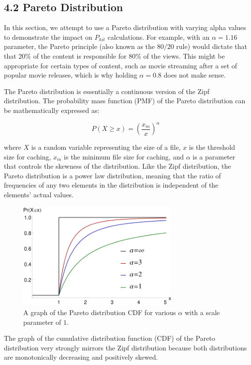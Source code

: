 \documentclass[
	a4paper, %
	10pt, %
	unnumberedsections, %
	twoside, %
]{LTJournalArticle}
\begin{document}
\subsection{4.2 Pareto Distribution}

In this section, we attempt to use a Pareto distribution with varying alpha values to demonstrate the impact on $P_{hit}$ calculations. For example, with an $\alpha = 1.16$ parameter, the Pareto principle (also known as the $80/20$ rule) would dictate that that 20\% of the content is responsible for 80\% of the views. This might be appropriate for certain types of content, such as movie streaming after a set of popular movie releases, which is why holding $\alpha = 0.8$ does not make sense. 

The Pareto distribution is essentially a continuous version of the Zipf distribution. The probability mass function (PMF) of the Pareto distribution can be mathematically expressed as:

\[
    P(X \geq x) = \left(\frac{x_m}{x}\right)^\alpha
\]

where $X$ is a random variable representing the size of a file, $x$ is the threshold size for caching, $x_m$ is the minimum file size for caching, and $\alpha$ is a parameter that controls the skewness of the distribution. Like the Zipf distribution, the Pareto distribution is a power law distribution, meaning that the ratio of frequencies of any two elements in the distribution is independent of the elements' actual values.  

\begin{figure}[h]
	\begin{center}
		\includegraphics[width=8.1cm]{pareto.png}
	\end{center}
	\caption{A graph of the Pareto distribution CDF for various $\alpha$ with a scale parameter of $1$.}	
\end{figure}

The graph of the cumulative distribution function (CDF) of the Pareto distribution very strongly mirrors the Zipf distribution because both distributions are monotonically decreasing and positively skewed. 
\end{document}
